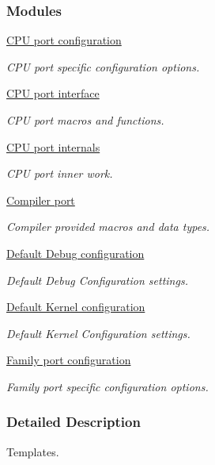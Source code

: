 \subsubsection*{Modules}
\begin{DoxyCompactItemize}
\item 
\hyperlink{group__template__cpu__cfg}{C\-P\-U port configuration}
\begin{DoxyCompactList}\small\item\em C\-P\-U port specific configuration options. \end{DoxyCompactList}\item 
\hyperlink{group__template__cpu__intf}{C\-P\-U port interface}
\begin{DoxyCompactList}\small\item\em C\-P\-U port macros and functions. \end{DoxyCompactList}\item 
\hyperlink{group__template__cpu__impl}{C\-P\-U port internals}
\begin{DoxyCompactList}\small\item\em C\-P\-U port inner work. \end{DoxyCompactList}\item 
\hyperlink{group__template__compiler}{Compiler port}
\begin{DoxyCompactList}\small\item\em Compiler provided macros and data types. \end{DoxyCompactList}\item 
\hyperlink{group__template__dbg__cfg}{Default Debug configuration}
\begin{DoxyCompactList}\small\item\em Default Debug Configuration settings. \end{DoxyCompactList}\item 
\hyperlink{group__template__kern__cfg}{Default Kernel configuration}
\begin{DoxyCompactList}\small\item\em Default Kernel Configuration settings. \end{DoxyCompactList}\item 
\hyperlink{group__template__family__cfg}{Family port configuration}
\begin{DoxyCompactList}\small\item\em Family port specific configuration options. \end{DoxyCompactList}\end{DoxyCompactItemize}


\subsubsection{Detailed Description}
Templates. 